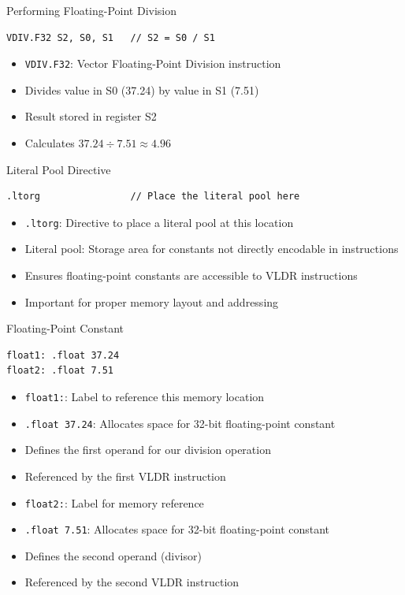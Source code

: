 \documentclass[aspectratio=169]{beamer}
\begin{document}
\begin{frame}[fragile]{Performing Floating-Point Division}
\begin{verbatim}
VDIV.F32 S2, S0, S1   // S2 = S0 / S1
\end{verbatim}

\begin{itemize}
\item \texttt{VDIV.F32}: Vector Floating-Point Division instruction
\item Divides value in S0 (37.24) by value in S1 (7.51)
\item Result stored in register S2
\item Calculates $37.24 \div 7.51 \approx 4.96$
\end{itemize}
\end{frame}



\begin{frame}[fragile]{Literal Pool Directive}
\begin{verbatim}
.ltorg                // Place the literal pool here
\end{verbatim}

\begin{itemize}
\item \texttt{.ltorg}: Directive to place a literal pool at this location
\item Literal pool: Storage area for constants not directly encodable in instructions
\item Ensures floating-point constants are accessible to VLDR instructions
\item Important for proper memory layout and addressing
\end{itemize}
\end{frame}

\begin{frame}[fragile]{Floating-Point Constant}
\begin{verbatim}
float1: .float 37.24
float2: .float 7.51
\end{verbatim}

\begin{itemize}
\item \texttt{float1:}: Label to reference this memory location
\item \texttt{.float 37.24}: Allocates space for 32-bit floating-point constant
\item Defines the first operand for our division operation
\item Referenced by the first VLDR instruction
\item \texttt{float2:}: Label for memory reference
\item \texttt{.float 7.51}: Allocates space for 32-bit floating-point constant
\item Defines the second operand (divisor)
\item Referenced by the second VLDR instruction
\end{itemize}
\end{frame}
\end{document}
